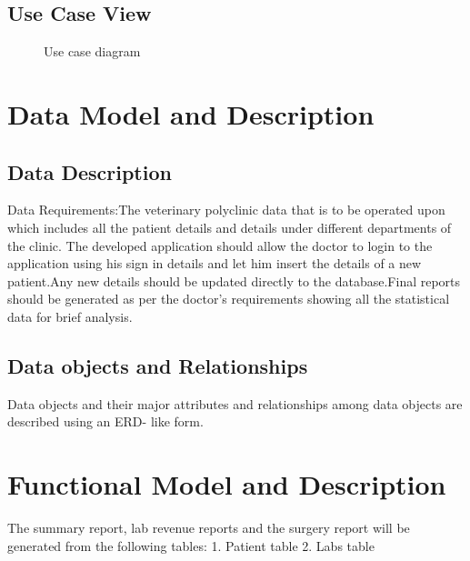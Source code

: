 \documentclass[oneside,a4paper,12pt]{book}
\begin{document}
\newpage
\subsection{Use Case View}
\begin{center}
	\begin{figure}[!htbp]
		\centering
	  \caption{Use case diagram}
	  \label{fig:usecase}
	\end{figure}
\end{center}  

\section{Data Model and Description}  
\subsection{Data Description}  
Data Requirements:The veterinary polyclinic data that is to be operated upon which includes all the patient details and details under different departments of the clinic.
The developed application should allow the doctor to login to the application using his sign in details and let him insert the details of a new patient.Any new details should be updated directly to the database.Final reports should be generated as per the doctor’s requirements showing all the statistical data for brief analysis.

\subsection{Data objects and Relationships}
Data objects and their major attributes and relationships among data objects are described using an ERD- like form.
 
 
\section{Functional Model and Description}  
The summary report, lab revenue reports and the surgery report will be generated from the following tables:
1. Patient table
2. Labs table
\end{document}
